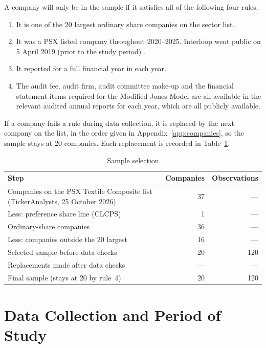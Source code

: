 A company will only be in the sample if it satisfies all of the following four rules.

\begin{enumerate}[label=\arabic*.]
  \item It is one of the 20 largest ordinary share companies on the sector list.
  \item It was a PSX listed company throughout 2020--2025. Interloop went public on 5 April 2019 (prior to the study period) \parencite{psx2026}.
  \item It reported for a full financial year in each year.
  \item The audit fee, audit firm, audit committee make-up and the financial statement items required for the Modified Jones Model are all available in the relevant audited annual reports for each year, which are all publicly available.
\end{enumerate}

If a company fails a rule during data collection, it is replaced by the next company on the list, in the order given in Appendix~\ref{app:companies}, so the sample stays at 20 companies. Each replacement is recorded in Table~\ref{tab:sample}.

\begin{table}[ht]
  \centering
  \caption{Sample selection}
  \label{tab:sample}
  \small
  \begin{tabular}{@{}p{8.5cm}rr@{}}
    \toprule
    Step & Companies & Observations \\
    \midrule
    Companies on the PSX Textile Composite list (TickerAnalysts, 25 October 2026) & 37 & --- \\
    Less: preference share line (CLCPS) & 1 & --- \\
    Ordinary-share companies & 36 & --- \\
    Less: companies outside the 20 largest & 16 & --- \\
    Selected sample before data checks & 20 & 120 \\
    Replacements made after data checks & --- & --- \\
    Final sample (stays at 20 by rule~4) & 20 & 120 \\
    \bottomrule
  \end{tabular}
\end{table}

\section{Data Collection and Period of Study}

